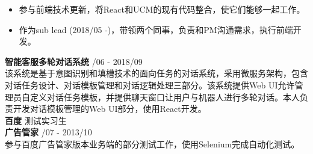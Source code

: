 \documentclass[a4paper]{article}
\newenvironment{changemargin}[2]{%
  \begin{list}{}{%
    \setlength{\topsep}{0pt}%
    \setlength{\leftmargin}{#1}%
    \setlength{\rightmargin}{#2}%
    \setlength{\listparindent}{\parindent}%
    \setlength{\itemindent}{\parindent}%
    \setlength{\parsep}{\parskip}%
  }%
  \item[]}{\end{list}
}
\newenvironment{body} {
	\vspace*{-16pt}
	\begin{changemargin}{-0.5in}{-0.5in}
  }	
	{\end{changemargin}
}
\begin{document}
\begin{body}
\begin{itemize}
	\end{itemize}
	\vspace*{-12pt}
	\begin{itemize} \itemsep -0pt  %
		\item 参与前端技术更新，将{\fontarial React}和{\fontarial UCM}的现有代码整合，使它们能够一起工作。\\
	\end{itemize}
	\vspace*{-12pt}
	\begin{itemize} \itemsep -0pt  %
		\item 作为{\fontarial sub lead (2018/05 -)}，带领两个同事，负责和{\fontarial PM}沟通需求，执行前端开发。\\
	\end{itemize}
	\vspace*{-2pt}
	\textbf{智能客服多轮对话系统} \hfill {/06 - 2018/09}\\ 
	该系统是基于意图识别和填槽技术的面向任务的对话系统，采用微服务架构，包含对话任务设计、对话模板管理和对话逻辑处理三部分。该系统提供{\fontarial Web UI}允许管理员自定义对话任务模板，并提供聊天窗口让用户与机器人进行多轮对话。本人负责开发对话模板管理的{\fontarial Web UI}部分，使用{\fontarial React}开发。\\
	\vspace{10pt}
	\textbf{百度} \hfill 测试实习生\\ 
	\textbf{广告管家} \hfill {/07 - 2013/10}\\ 
	参与百度广告管家{}版本业务端的部分测试工作，使用{\fontarial Selenium}完成自动化测试。


\end{body}
\end{document}
